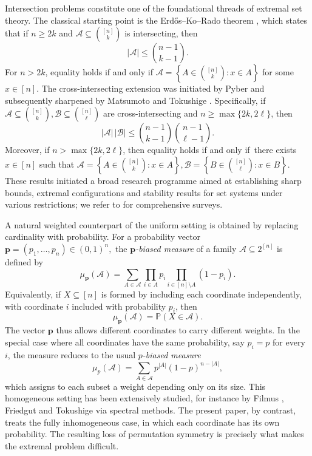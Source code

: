 \documentclass[11pt]{article}
\numberwithin{equation}{section}
\theoremstyle{definition}
\theoremstyle{remark}
\begin{document}
Intersection problems constitute one of the foundational threads of extremal set theory. The classical starting point is the Erd\H{o}s--Ko--Rado theorem \cite{ErdosKoRado}, which states that if $n\geq 2k$ and $\mathcal{A}\subseteq\binom{[n]}{k}$ is intersecting, then
\begin{equation*}
 |\mathcal{A}|\leq\binom{n-1}{k-1}.
\end{equation*}
For $n>2k$, equality holds if and only if $\mathcal{A}= \left\{ A \in \binom{[n]}{k} : x \in A \right\}$ for some $x\in[n]$.
The cross-intersecting extension was initiated by Pyber \cite{Pyber} and subsequently sharpened by Matsumoto and Tokushige \cite{MatsumotoTokushige}. Specifically, if
$
 \mathcal{A}\subseteq\binom{[n]}{k},
 \mathcal{B}\subseteq\binom{[n]}{\ell}
$
are cross-intersecting and $n \geq\max\{2k,2\ell\}$, then
$$
 |\mathcal{A}|\,|\mathcal{B}|
 \leq
 \binom{n-1}{k-1}\binom{n-1}{\ell-1}.
$$
Moreover, if  $n >\max\{2k,2\ell\}$, then equality holds if and only if\ there exists $x\in[n]$ such that
 $\mathcal{A}= \left\{ A \in \binom{[n]}{k} : x \in A \right\}, \mathcal{B}= \left\{ B \in \binom{[n]}{\ell} : x \in B \right\}$.  These results initiated a broad research programme  aimed at establishing sharp bounds, extremal configurations and stability results for set systems under various restrictions; we refer to  \cite{FranklTokushigeSurvey,FranklTokushigeBook} for comprehensive surveys.
 
A natural weighted counterpart of the uniform setting is obtained by replacing cardinality with probability. For a probability vector
$
 \mathbf p=(p_1,\ldots,p_n)\in(0,1)^n,
$
the \textit{$\mathbf{p}$-biased measure} of a family $\mathcal{A}\subseteq 2^{[n]}$ is defined by
$$
 \mu_{\mathbf p}(\mathcal{A})
 =
 \sum_{A\in\mathcal{A}}
 \prod_{i\in A}p_i
 \prod_{i\in[n]\setminus A}(1-p_i).
$$
Equivalently, if $X\subseteq[n]$ is formed by including each coordinate independently, with coordinate $i$ included with probability $p_i$, then
\begin{equation*}
 \mu_{\mathbf p}(\mathcal{A})=\mathbb{P}(X\in\mathcal{A}).
\end{equation*}
The vector $\mathbf p$ thus allows different coordinates to carry different weights. 
In the special case where all coordinates have the same probability, say $p_i=p$ for every $i$, the measure reduces to the usual \textit{$p$-biased measure}
$$
\mu_p(\mathcal{A})=\sum_{A\in\mathcal{A}} p^{|A|}(1-p)^{n-|A|},
$$
which assigns to each subset a weight depending only on its size. This homogeneous setting has been extensively studied, for instance by Filmus \cite{F13}, Friedgut \cite{Friedgut} and Tokushige \cite{Tokushige} via spectral methods. The present paper, by contrast, treats the fully inhomogeneous case, in which each coordinate has its own probability. The resulting loss of permutation symmetry is precisely what makes the extremal problem difficult.
\end{document}

